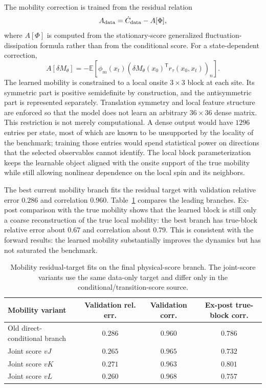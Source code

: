 \documentclass[11pt]{article}
\newcommand{\E}{\mathbb{E}}
\newcommand{\T}{\mathsf{T}}
\begin{document}
The mobility correction is trained from the residual relation
\[
  A_{\rm data} = \dot C_{\rm data} - A[\Phi],
\]
where $A[\Phi]$ is computed from the stationary-score generalized
fluctuation-dissipation formula rather than from the conditional score.  For a
state-dependent correction,
\[
  A[\delta M_\theta]
  =
  -\E\!\left[
    \phi_m(x_t)
    \left(\delta M_\theta(x_0)^\T r_\tau(x_0,x_t)\right)_n
  \right].
\]
The learned mobility is constrained to a local onsite $3\times3$ block at each
site.  Its symmetric part is positive semidefinite by construction, and the
antisymmetric part is represented separately.  Translation symmetry and local
feature structure are enforced so that the model does not learn an arbitrary
$36\times36$ dense matrix.  This restriction is not merely computational.  A
dense output would have $1296$ entries per state, most of which are known to be
unsupported by the locality of the benchmark; training those entries would spend
statistical power on directions that the selected observables cannot identify.
The local block parameterization keeps the learnable object aligned with the
onsite support of the true mobility while still allowing nonlinear dependence
on the local spin and its neighbors.

The best current mobility branch fits the residual target with validation
relative error $0.286$ and correlation $0.960$.  Table~\ref{tab:mfit} compares
the leading branches.  Ex-post comparison with the true mobility shows that the
learned block is still only a coarse reconstruction of the true local mobility:
the best branch has true-block relative error about $0.67$ and correlation about
$0.79$.  This is consistent with the forward results: the learned mobility
substantially improves the dynamics but has not saturated the benchmark.

\begin{table}[tbp]
  \centering
  \caption{Mobility residual-target fits on the final physical-score branch.
  The joint-score variants use the same data-only target and differ only in the
  conditional/transition-score source.}
  \label{tab:mfit}
  \begin{tabular}{@{}lccc@{}}
    \toprule
    Mobility variant & Validation rel. err. & Validation corr. & Ex-post true-block corr. \\
    \midrule
    Old direct-conditional branch & $0.286$ & $0.960$ & $0.786$ \\
    Joint score $vJ$ & $0.265$ & $0.965$ & $0.732$ \\
    Joint score $vK$ & $0.271$ & $0.963$ & $0.801$ \\
    Joint score $vL$ & $0.260$ & $0.968$ & $0.757$ \\
    \bottomrule
  \end{tabular}
\end{table}
\end{document}
